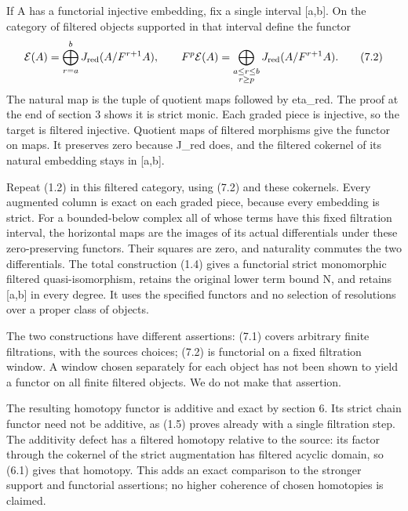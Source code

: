 If A has a functorial injective embedding,\allowbreak{} fix a single interval [a,\allowbreak{}b]\allowbreak{}. On the category of filtered objects supported in that interval define the functor \[
 \mathcal E(A)=
 \bigoplus_{r=a}^{b}J_{\rm red}(A/F^{r+1}A),\qquad
 F^p\mathcal E(A)=
 \bigoplus_{\substack{a\le r\le b\\r\ge p}}
              J_{\rm red}(A/F^{r+1}A).                       \tag{7.2}
\] The natural map is the tuple of quotient maps followed by eta\_\allowbreak{}red. The proof at the end of section 3 shows it is strict monic. Each graded piece is injective,\allowbreak{} so the target is filtered injective. Quotient maps of filtered morphisms give the functor on maps. It preserves zero because J\_\allowbreak{}red does,\allowbreak{} and the filtered cokernel of its natural embedding stays in [a,\allowbreak{}b]\allowbreak{}.

Repeat (1.2)\allowbreak{} in this filtered category,\allowbreak{} using (7.2)\allowbreak{} and these cokernels. Every augmented column is exact on each graded piece,\allowbreak{} because every embedding is strict. For a bounded-below complex all of whose terms have this fixed filtration interval,\allowbreak{} the horizontal maps are the images of its actual differentials under these zero-preserving functors. Their squares are zero,\allowbreak{} and naturality commutes the two differentials. The total construction (1.4)\allowbreak{} gives a functorial strict monomorphic filtered quasi-isomorphism,\allowbreak{} retains the original lower term bound N,\allowbreak{} and retains [a,\allowbreak{}b]\allowbreak{} in every degree. It uses the specified functors and no selection of resolutions over a proper class of objects.

The two constructions have different assertions:\allowbreak{} (7.1)\allowbreak{} covers arbitrary finite filtrations,\allowbreak{} with the source\textquotesingle s choices; (7.2)\allowbreak{} is functorial on a fixed filtration window. A window chosen separately for each object has not been shown to yield a functor on all finite filtered objects. We do not make that assertion.

The resulting homotopy functor is additive and exact by section 6. Its strict chain functor need not be additive,\allowbreak{} as (1.5)\allowbreak{} proves already with a single filtration step. The additivity defect has a filtered homotopy relative to the source:\allowbreak{} its factor through the cokernel of the strict augmentation has filtered acyclic domain,\allowbreak{} so (6.1)\allowbreak{} gives that homotopy. This adds an exact comparison to the stronger support and functorial assertions; no higher coherence of chosen homotopies is claimed.

